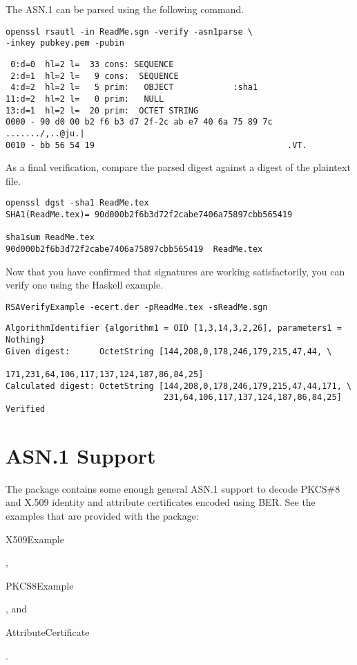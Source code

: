 \documentclass{article}
\begin{document}
The ASN.1 can be parsed using the following command.

\begin{lstlisting}[frame=single]
openssl rsautl -in ReadMe.sgn -verify -asn1parse \
-inkey pubkey.pem -pubin
\end{lstlisting}

\begin{lstlisting}
 0:d=0  hl=2 l=  33 cons: SEQUENCE
 2:d=1  hl=2 l=   9 cons:  SEQUENCE
 4:d=2  hl=2 l=   5 prim:   OBJECT            :sha1
11:d=2  hl=2 l=   0 prim:   NULL
13:d=1  hl=2 l=  20 prim:  OCTET STRING
0000 - 90 d0 00 b2 f6 b3 d7 2f-2c ab e7 40 6a 75 89 7c   ......./,..@ju.|
0010 - bb 56 54 19                                       .VT.
\end{lstlisting}

As a final verification, compare the parsed digest against a digest
of the plaintext file.

\begin{lstlisting}[frame=single]
openssl dgst -sha1 ReadMe.tex
SHA1(ReadMe.tex)= 90d000b2f6b3d72f2cabe7406a75897cbb565419

sha1sum ReadMe.tex
90d000b2f6b3d72f2cabe7406a75897cbb565419  ReadMe.tex
\end{lstlisting}

Now that you have confirmed that signatures are working satisfactorily,
you can verify one using the Haskell example.

\begin{lstlisting}[frame=single]
RSAVerifyExample -ecert.der -pReadMe.tex -sReadMe.sgn
\end{lstlisting}

\begin{lstlisting}
AlgorithmIdentifier {algorithm1 = OID [1,3,14,3,2,26], parameters1 = Nothing}
Given digest:      OctetString [144,208,0,178,246,179,215,47,44, \
                                171,231,64,106,117,137,124,187,86,84,25]
Calculated digest: OctetString [144,208,0,178,246,179,215,47,44,171, \
                                231,64,106,117,137,124,187,86,84,25]
Verified
\end{lstlisting}

\section{ASN.1 Support}

The package contains some enough general ASN.1 support to decode PKCS\#8 and
X.509 identity and attribute certificates encoded using BER. See the examples that
are provided with the package: \begin{tt}X509Example\end{tt},
\begin{tt}PKCS8Example\end{tt}, and \begin{tt}AttributeCertificate\end{tt}.
\end{document}
